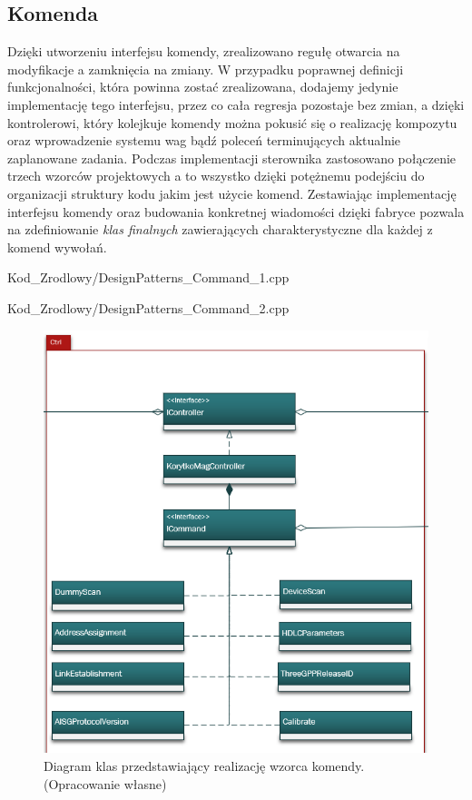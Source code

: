     \subsection{Komenda}
        Dzięki utworzeniu interfejsu komendy, zrealizowano regułę otwarcia na modyfikacje a zamknięcia na zmiany.
        W przypadku poprawnej definicji funkcjonalności, która powinna zostać zrealizowana, dodajemy jedynie implementację tego interfejsu,
        przez co cała regresja pozostaje bez zmian, a dzięki kontrolerowi, który kolejkuje komendy można pokusić się o realizację kompozytu oraz
        wprowadzenie systemu wag bądź poleceń terminujących aktualnie zaplanowane zadania.
        Podczas implementacji sterownika zastosowano połączenie trzech wzorców projektowych a to wszystko dzięki potężnemu podejściu do organizacji
        struktury kodu jakim jest użycie komend. Zestawiając implementację interfejsu komendy oraz budowania konkretnej wiadomości dzięki fabryce
        pozwala na zdefiniowanie \textit{klas finalnych} zawierających charakterystyczne dla każdej z komend wywołań. 
        
            {Kod_Zrodlowy/DesignPatterns_Command_1.cpp}
        
            {Kod_Zrodlowy/DesignPatterns_Command_2.cpp}
        \begin{figure}[h!]
            \centering
            \includegraphics[scale=0.90]{Obrazki/DiagramyKlas/Ctrl.png}
            \caption{Diagram klas przedstawiający realizację wzorca komendy.
                \newline(Opracowanie własne)}
        \end{figure}
    \newpage
